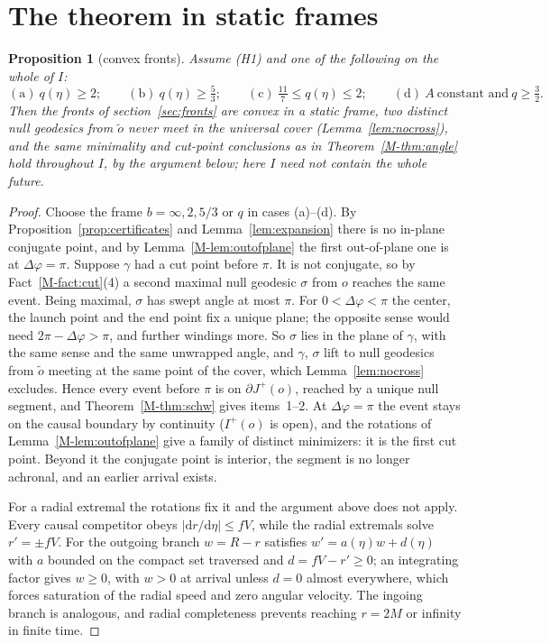 \documentclass[aip,jmp,amsmath,amssymb,reprint]{revtex4-2}
\newcommand{\dd}{\mathrm{d}}
\theoremstyle{plain}
\newtheorem{proposition}{Proposition}[section]
\theoremstyle{definition}
\begin{document}
\section{The theorem in static frames}
\begin{proposition}[convex fronts]\label{prop:angle-frames}
Assume (H1) and one of the following on the whole of $I$:
\begin{equation}
  \mathrm{(a)}\ q(\eta)\ge2;\qquad \mathrm{(b)}\ q(\eta)\ge\tfrac53;\qquad
  \mathrm{(c)}\ \tfrac{11}{7}\le q(\eta)\le2;\qquad
  \mathrm{(d)}\ A\ \text{constant and}\ q\ge\tfrac32 .
  \label{eq:bands}
\end{equation}
Then the fronts of section~\ref{sec:fronts} are convex in a static frame, two distinct null
geodesics from $\tilde o$ never meet in the universal cover (Lemma~\ref{lem:nocross}), and
the same minimality and cut-point conclusions as in Theorem~\ref{M-thm:angle} hold throughout $I$,
by the argument below; here $I$ need not contain the whole future.
\end{proposition}

\begin{proof}
Choose the frame $b=\infty,2,5/3$ or $q$ in cases (a)--(d). By
Proposition~\ref{prop:certificates} and Lemma~\ref{lem:expansion} there is no in-plane
conjugate point, and by Lemma~\ref{M-lem:outofplane} the first out-of-plane one is at
$\Delta\varphi=\pi$. Suppose $\gamma$ had a cut point before $\pi$. It is not conjugate, so
by Fact~\ref{M-fact:cut}(4) a second maximal null geodesic $\sigma$ from $o$ reaches the same
event. Being maximal, $\sigma$ has swept angle at most $\pi$. For $0<\Delta\varphi<\pi$ the
center, the launch point and the end point fix a unique plane; the opposite sense would
need $2\pi-\Delta\varphi>\pi$, and further windings more. So $\sigma$ lies in the plane of
$\gamma$, with the same sense and the same unwrapped angle, and $\gamma$, $\sigma$ lift to
null geodesics from $\tilde o$ meeting at the same point of the cover, which
Lemma~\ref{lem:nocross} excludes. Hence every event before $\pi$ is on
$\partial J^+(o)$, reached by a unique null segment, and Theorem~\ref{M-thm:schw} gives
items~1--2. At $\Delta\varphi=\pi$ the event stays on the causal boundary by continuity
($I^+(o)$ is open), and the rotations of Lemma~\ref{M-lem:outofplane} give a family of
distinct minimizers: it is the first cut point. Beyond it the conjugate point is
interior, the segment is no longer achronal, and an earlier arrival exists.

For a radial extremal the rotations fix it and the argument above does not apply. Every
causal competitor obeys $|\dd r/\dd\eta|\le fV$, while the radial extremals solve
$r'=\pm fV$. For the outgoing branch $w=R-r$ satisfies $w'=a(\eta)w+d(\eta)$ with $a$
bounded on the compact set traversed and $d=fV-r'\ge0$; an integrating factor gives
$w\ge0$, with $w>0$ at arrival unless $d=0$ almost everywhere, which forces saturation of
the radial speed and zero angular velocity. The ingoing branch is analogous, and radial
completeness prevents reaching $r=2M$ or infinity in finite time.
\end{proof}
\end{document}
